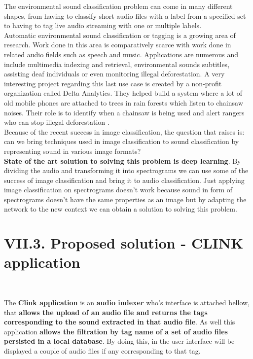 \documentclass[11pt, a4papper]{report}
\theoremstyle{plain}
\theoremstyle{definition}
\theoremstyle{definition}
\theoremstyle{proposition}
\begin{document}
The environmental sound classification problem can come in many different shapes, from having to classify short audio files with a label from a specified set to having to tag live audio streaming with one or multiple labels.
\\

Automatic environmental sound classification or tagging is a growing area of research. Work done in this area is comparatively scarce with work done in related audio fields such as speech and music. Applications are numerous and include multimedia indexing and retrieval, environmental sounds subtitles, assisting deaf individuals or even monitoring illegal deforestation. A very interesting project regarding this last use case is created by a non-profit organization called Delta Analytics. They helped build a system where a lot of old mobile phones are attached to trees in rain forests which listen to chainsaw noises. Their role is to identify when a chainsaw is being used and alert rangers who can stop illegal deforestation \cite{13}.
\\

Because of the recent success in image classification, the question that raises is: can we bring techniques used in image classification to sound classification by representing sound in various image formats?
\\

\textbf{State of the art solution to solving this problem is deep learning}. By dividing the audio and transforming it into spectrograms we can use some of the success of image classification and bring it to audio classification. Just applying image classification on spectrograms doesn't work because sound in form of spectrograms doesn't have the same properties as an image but by adapting the network to the new context we can obtain a solution to solving this problem.

\section*{VII.3. Proposed solution - CLINK application}
\

The \textbf{Clink application} is an \textbf{audio indexer} who's interface is attached bellow, that \textbf{allows the upload of an audio file and returns the tags corresponding to the sound extracted in that audio file}. As well this application \textbf{allows the filtration by tag name of a set of audio files persisted in a local database}. By doing this, in the user interface will be displayed a couple of audio files if any corresponding to that tag.
\end{document}

